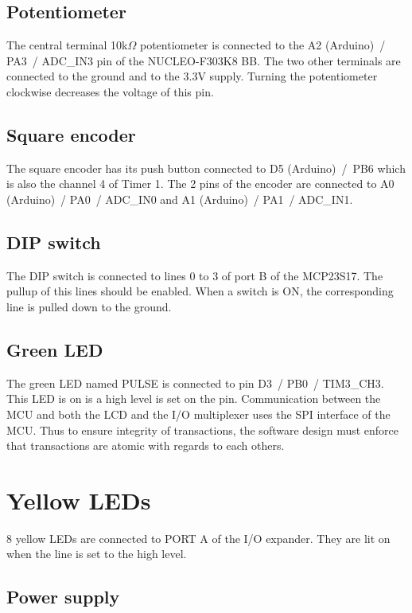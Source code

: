 \documentclass[11pt]{report}
\begin{document}
\subsection{Potentiometer}

The central terminal 10k$\Omega$ potentiometer is connected to the A2 (Arduino)~/ PA3~/ ADC\_IN3 pin of the NUCLEO-F303K8 BB. The two other terminals are connected to the ground and to the 3.3V supply. Turning the potentiometer clockwise decreases the voltage of this pin.

\subsection{Square encoder}

The square encoder has its push button connected to D5 (Arduino)~/~PB6 which is also the channel 4 of Timer 1. The 2 pins of the encoder are connected to A0 (Arduino)~/ PA0~/ ADC\_IN0 and A1 (Arduino)~/ PA1~/ ADC\_IN1.

\subsection{DIP switch}

The DIP switch is connected to lines 0 to 3 of port B of the MCP23S17. The pullup of this lines should be enabled. When a switch is ON, the corresponding line is pulled down to the ground.

\subsection{Green LED}

The green LED named PULSE is connected to pin D3~/ PB0~/ TIM3\_CH3. This LED is on is a high level is set on the pin.
Communication between the MCU and both the LCD and the I/O multiplexer uses the SPI interface of the MCU.
Thus to ensure integrity of transactions, the software design must enforce that transactions are atomic with regards to each others.

\section{Yellow LEDs}

8 yellow LEDs are connected to PORT A of the I/O expander. They are lit on when the line is set to the high level. 

\subsection{Power supply}
\end{document}
